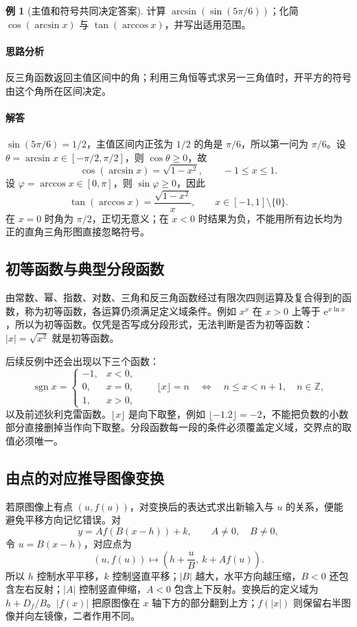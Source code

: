 \documentclass[UTF8,fontset=fandol,12pt,oneside,openany]{ctexrep}
\newcommand{\ee}{\mathrm e}
\theoremstyle{definition}
\newtheorem{example}{例}[chapter]
\begin{document}
\begin{example}[主值和符号共同决定答案]
计算 $\arcsin(\sin(5\pi/6))$；化简 $\cos(\arcsin x)$ 与 $\tan(\arccos x)$，并写出适用范围。
\end{example}
\paragraph{思路分析} 反三角函数返回主值区间中的角；利用三角恒等式求另一三角值时，开平方的符号由这个角所在区间决定。
\paragraph{解答} $\sin(5\pi/6)=1/2$，主值区间内正弦为 $1/2$ 的角是 $\pi/6$，所以第一问为 $\pi/6$。设 $\theta=\arcsin x\in[-\pi/2,\pi/2]$，则 $\cos\theta\ge0$，故
\[
 \cos(\arcsin x)=\sqrt{1-x^2},\qquad -1\le x\le1.
\]
设 $\varphi=\arccos x\in[0,\pi]$，则 $\sin\varphi\ge0$，因此
\[
 \tan(\arccos x)=\frac{\sqrt{1-x^2}}{x},\qquad x\in[-1,1]\setminus\{0\}.
\]
在 $x=0$ 时角为 $\pi/2$，正切无意义；在 $x<0$ 时结果为负，不能用所有边长均为正的直角三角形图直接忽略符号。

\subsection{初等函数与典型分段函数}
由常数、幂、指数、对数、三角和反三角函数经过有限次四则运算及复合得到的函数，称为初等函数，各运算仍须满足定义域条件。例如 $x^x$ 在 $x>0$ 上等于 $\ee^{x\ln x}$，所以为初等函数。仅凭是否写成分段形式，无法判断是否为初等函数：$|x|=\sqrt{x^2}$ 就是初等函数。

后续反例中还会出现以下三个函数：
\[
 \operatorname{sgn}x=\begin{cases}-1,&x<0,\\0,&x=0,\\1,&x>0,\end{cases}
 \qquad \lfloor x\rfloor=n\quad\Longleftrightarrow\quad n\le x<n+1,
 \quad n\in\mathbb Z,
\]
以及前述狄利克雷函数。$\lfloor x\rfloor$ 是向下取整，例如 $\lfloor-1.2\rfloor=-2$，不能把负数的小数部分直接删掉当作向下取整。分段函数每一段的条件必须覆盖定义域，交界点的取值必须唯一。

\subsection{由点的对应推导图像变换}
\label{lec:01:graph}
若原图像上有点 $(u,f(u))$，对变换后的表达式求出新输入与 $u$ 的关系，便能避免平移方向记忆错误。对
\[
 y=A f(B(x-h))+k,\qquad A\ne0,\quad B\ne0,
\]
令 $u=B(x-h)$，对应点为
\[
 (u,f(u))\longmapsto\left(h+\frac{u}{B},\ k+A f(u)\right).
\]
所以 $h$ 控制水平平移，$k$ 控制竖直平移；$|B|$ 越大，水平方向越压缩，$B<0$ 还包含左右反射；$|A|$ 控制竖直伸缩，$A<0$ 包含上下反射。变换后的定义域为 $h+D_f/B$。$|f(x)|$ 把原图像在 $x$ 轴下方的部分翻到上方；$f(|x|)$ 则保留右半图像并向左镜像，二者作用不同。
\end{document}

